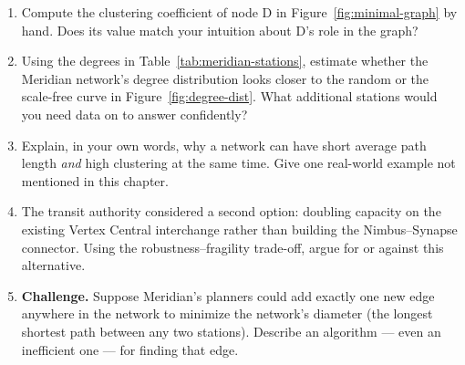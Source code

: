 \documentclass{tufte-book}
\begin{document}
\begin{enumerate}
\item Compute the clustering coefficient of node D in Figure~\ref{fig:minimal-graph}
by hand. Does its value match your intuition about D's role in the graph?
\item Using the degrees in Table~\ref{tab:meridian-stations}, estimate whether the
Meridian network's degree distribution looks closer to the random or the scale-free
curve in Figure~\ref{fig:degree-dist}. What additional stations would you need data
on to answer confidently?
\item Explain, in your own words, why a network can have short average path length
\emph{and} high clustering at the same time. Give one real-world example not
mentioned in this chapter.
\item The transit authority considered a second option: doubling capacity on the
existing Vertex Central interchange rather than building the Nimbus--Synapse
connector. Using the robustness--fragility trade-off, argue for or against this
alternative.
\item \textbf{Challenge.} Suppose Meridian's planners could add exactly one new
edge anywhere in the network to minimize the network's diameter (the longest
shortest path between any two stations). Describe an algorithm --- even an
inefficient one --- for finding that edge.
\end{enumerate}
\end{document}
